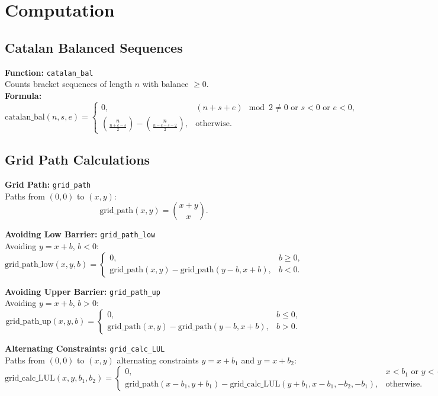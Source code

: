 \section{Computation}
    \subsection{Catalan Balanced Sequences}
    \textbf{Function:} \texttt{catalan\_bal} \\
    Counts bracket sequences of length $n$ with balance $\geq 0$. \\
    \textbf{Formula:}
    \[
    \text{catalan\_bal}(n, s, e) =
    \begin{cases}
    0, & (n+s+e)\!\mod\!2 \neq 0 \text{ or } s<0 \text{ or } e<0, \\
    \binom{n}{\frac{n+e-s}{2}} - \binom{n}{\frac{n-e-s-2}{2}}, & \text{otherwise}.
    \end{cases}
    \]

    \subsection{Grid Path Calculations}
    \textbf{Grid Path:} \texttt{grid\_path} \\
    Paths from $(0, 0)$ to $(x, y)$:
    \[
    \text{grid\_path}(x, y) = \binom{x+y}{x}.
    \]

    \textbf{Avoiding Low Barrier:} \texttt{grid\_path\_low} \\
    Avoiding $y=x+b$, $b<0$:
    \[
    \text{grid\_path\_low}(x, y, b) = 
    \begin{cases}
    0, & b\geq 0, \\
    \text{grid\_path}(x, y) - \text{grid\_path}(y-b, x+b), & b<0.
    \end{cases}
    \]

    \textbf{Avoiding Upper Barrier:} \texttt{grid\_path\_up} \\
    Avoiding $y=x+b$, $b>0$:
    \[
    \text{grid\_path\_up}(x, y, b) = 
    \begin{cases}
    0, & b\leq 0, \\
    \text{grid\_path}(x, y) - \text{grid\_path}(y-b, x+b), & b>0.
    \end{cases}
    \]

    \textbf{Alternating Constraints:} \texttt{grid\_calc\_LUL} \\
    Paths from $(0, 0)$ to $(x, y)$ alternating constraints $y=x+b_1$ and $y=x+b_2$:
    \[
    \text{grid\_calc\_LUL}(x, y, b_1, b_2) = 
    \begin{cases}
    0, & x<b_1 \text{ or } y<-b_1, \\
    \text{grid\_path}(x-b_1, y+b_1) - \text{grid\_calc\_LUL}(y+b_1, x-b_1, -b_2, -b_1), & \text{otherwise}.
    \end{cases}
    \]

